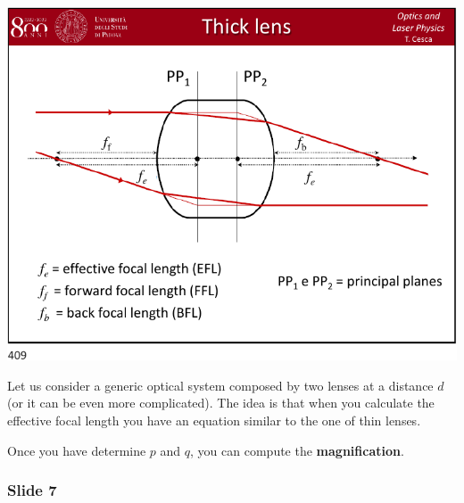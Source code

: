 \documentclass[../main/main.tex]{subfiles}
\begin{document}
\begin{minipage}[]{0.5\linewidth}
\centering
\includegraphics[page=6,width=1\textwidth]{../lessons/pdf_file/20_lecture.pdf}
\end{minipage}
\hspace{0.3cm}\vspace{0.3cm}
\begin{minipage}[c]{0.47\linewidth}

Let us consider a generic optical system composed by two lenses at a distance \( d \) (or it can be even more complicated). The idea is that when you calculate the effective focal length you have an equation similar to the one of thin lenses.

Once you have determine \( p \) and \( q \), you can compute the \textbf{magnification}.

\end{minipage}

\newpage

\subsubsection*{Slide 7}
\end{document}
